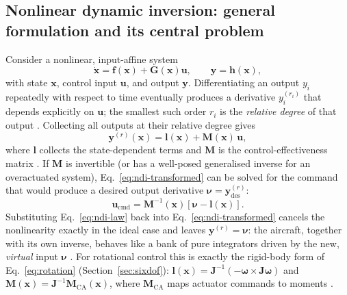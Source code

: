 \documentclass{article}
\begin{document}
\subsection{Nonlinear dynamic inversion: general formulation and its central problem}
\label{sec:ndi-theory}
Consider a nonlinear, input-affine system
\begin{equation}
    \dot{\mathbf{x}}=\mathbf{f}(\mathbf{x})+\mathbf{G}(\mathbf{x})\mathbf{u},\qquad \mathbf{y}=\mathbf{h}(\mathbf{x}),
    \label{eq:ndi-system}
\end{equation}
with state $\mathbf{x}$, control input $\mathbf{u}$, and output $\mathbf{y}$. Differentiating an output $y_i$ repeatedly with respect to time eventually produces a derivative $y_i^{(r_i)}$ that depends explicitly on $\mathbf{u}$; the smallest such order $r_i$ is the \emph{relative degree} of that output \citep{lombaerts2019,steinertPart1_2025}. Collecting all outputs at their relative degree gives
\begin{equation}
    \mathbf{y}^{(r)}(\mathbf{x})=\mathbf{l}(\mathbf{x})+\mathbf{M}(\mathbf{x})\,\mathbf{u},
    \label{eq:ndi-transformed}
\end{equation}
where $\mathbf{l}$ collects the state-dependent terms and $\mathbf{M}$ is the control-effectiveness matrix \citep{lombaerts2019}. If $\mathbf{M}$ is invertible (or has a well-posed generalised inverse for an overactuated system), Eq.~\eqref{eq:ndi-transformed} can be solved for the command that would produce a desired output derivative $\boldsymbol{\nu}=\mathbf{y}^{(r)}_{\mathrm{des}}$:
\begin{equation}
    \mathbf{u}_{\mathrm{cmd}}=\mathbf{M}^{-1}(\mathbf{x})\left[\boldsymbol{\nu}-\mathbf{l}(\mathbf{x})\right].
    \label{eq:ndi-law}
\end{equation}
Substituting Eq.~\eqref{eq:ndi-law} back into Eq.~\eqref{eq:ndi-transformed} cancels the nonlinearity exactly in the ideal case and leaves $\mathbf{y}^{(r)}=\boldsymbol{\nu}$: the aircraft, together with its own inverse, behaves like a bank of pure integrators driven by the new, \emph{virtual} input $\boldsymbol{\nu}$ \citep{lombaerts2019}. For rotational control this is exactly the rigid-body form of Eq.~\eqref{eq:rotation} (Section~\ref{sec:sixdof}): $\mathbf{l}(\mathbf{x})=\mathbf{J}^{-1}(-\boldsymbol{\omega}\times\mathbf{J}\boldsymbol{\omega})$ and $\mathbf{M}(\mathbf{x})=\mathbf{J}^{-1}\mathbf{M}_{\mathrm{CA}}(\mathbf{x})$, where $\mathbf{M}_{\mathrm{CA}}$ maps actuator commands to moments \citep{lombaerts2019}.
\end{document}
